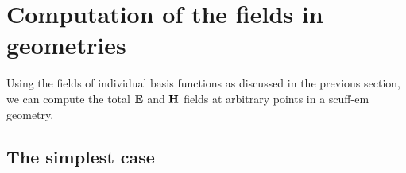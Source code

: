 \newpage
\section{Computation of the fields in \lss geometries}

Using the fields of individual basis functions as
discussed in the previous section, we can compute the 
total $\mathbf{E}$ and $\mathbf{H}$ fields at arbitrary points 
in a {\sc scuff-em} geometry.


\subsection{The simplest case}


